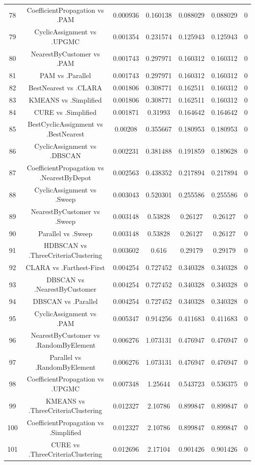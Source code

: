 \documentclass[a4paper,10pt]{article}
\begin{document}
\begin{landscape}
\begin{table}[!htp]
\begin{tabular}{ccccccc}
78&CoefficientPropagation vs .PAM&0.000936&0.160138&0.088029&0.088029&0\\
79&CyclicAssignment vs .UPGMC&0.001354&0.231574&0.125943&0.125943&0\\
80&NearestByCustomer vs .PAM&0.001743&0.297971&0.160312&0.160312&0\\
81&PAM vs .Parallel&0.001743&0.297971&0.160312&0.160312&0\\
82&BestNearest vs .CLARA&0.001806&0.308771&0.162511&0.160312&0\\
83&KMEANS vs .Simplified&0.001806&0.308771&0.162511&0.160312&0\\
84&CURE vs .Simplified&0.001871&0.31993&0.164642&0.164642&0\\
85&BestCyclicAssignment vs .BestNearest&0.00208&0.355667&0.180953&0.180953&0\\
86&CyclicAssignment vs .DBSCAN&0.002231&0.381488&0.191859&0.189628&0\\
87&CoefficientPropagation vs .NearestByDepot&0.002563&0.438352&0.217894&0.217894&0\\
88&CyclicAssignment vs .Sweep&0.003043&0.520301&0.255586&0.255586&0\\
89&NearestByCustomer vs .Sweep&0.003148&0.53828&0.26127&0.26127&0\\
90&Parallel vs .Sweep&0.003148&0.53828&0.26127&0.26127&0\\
91&HDBSCAN vs .ThreeCriteriaClustering&0.003602&0.616&0.29179&0.29179&0\\
92&CLARA vs .Farthest-First&0.004254&0.727452&0.340328&0.340328&0\\
93&DBSCAN vs .NearestByCustomer&0.004254&0.727452&0.340328&0.340328&0\\
94&DBSCAN vs .Parallel&0.004254&0.727452&0.340328&0.340328&0\\
95&CyclicAssignment vs .PAM&0.005347&0.914256&0.411683&0.411683&0\\
96&NearestByCustomer vs .RandomByElement&0.006276&1.073131&0.476947&0.476947&0\\
97&Parallel vs .RandomByElement&0.006276&1.073131&0.476947&0.476947&0\\
98&CoefficientPropagation vs .UPGMC&0.007348&1.25644&0.543723&0.536375&0\\
99&KMEANS vs .ThreeCriteriaClustering&0.012327&2.10786&0.899847&0.899847&0\\
100&CoefficientPropagation vs .Simplified&0.012327&2.10786&0.899847&0.899847&0\\
101&CURE vs .ThreeCriteriaClustering&0.012696&2.17104&0.901426&0.901426&0\\

\end{tabular}
\end{table}
\end{landscape}
\end{document}
